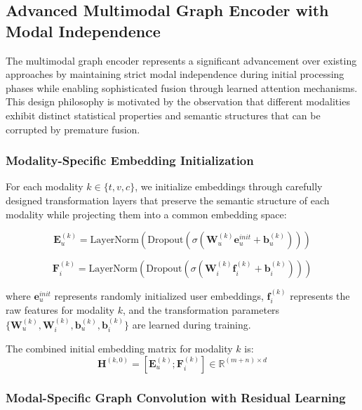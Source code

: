 \documentclass[pdflatex,sn-mathphys-num]{sn-jnl}%
\theoremstyle{thmstyleone}%
\theoremstyle{thmstyletwo}%
\theoremstyle{thmstylethree}%
\begin{document}
\subsection{Advanced Multimodal Graph Encoder with Modal Independence}\label{subsec:encoder}

The multimodal graph encoder represents a significant advancement over existing approaches by maintaining strict modal independence during initial processing phases while enabling sophisticated fusion through learned attention mechanisms. This design philosophy is motivated by the observation that different modalities exhibit distinct statistical properties and semantic structures that can be corrupted by premature fusion.

\subsubsection{Modality-Specific Embedding Initialization}

For each modality $k \in \{t, v, c\}$, we initialize embeddings through carefully designed transformation layers that preserve the semantic structure of each modality while projecting them into a common embedding space:

\begin{equation}
\mathbf{E}_u^{(k)} = \text{LayerNorm}(\text{Dropout}(\sigma(\mathbf{W}_u^{(k)} \mathbf{e}_u^{init} + \mathbf{b}_u^{(k)})))
\end{equation}

\begin{equation}
\mathbf{F}_i^{(k)} = \text{LayerNorm}(\text{Dropout}(\sigma(\mathbf{W}_i^{(k)} \mathbf{f}_i^{(k)} + \mathbf{b}_i^{(k)})))
\end{equation}

where $\mathbf{e}_u^{init}$ represents randomly initialized user embeddings, $\mathbf{f}_i^{(k)}$ represents the raw features for modality $k$, and the transformation parameters $\{\mathbf{W}_u^{(k)}, \mathbf{W}_i^{(k)}, \mathbf{b}_u^{(k)}, \mathbf{b}_i^{(k)}\}$ are learned during training.

The combined initial embedding matrix for modality $k$ is:
\begin{equation}
\mathbf{H}^{(k,0)} = [\mathbf{E}_u^{(k)}; \mathbf{F}_i^{(k)}] \in \mathbb{R}^{(m+n) \times d}
\end{equation}

\subsubsection{Modal-Specific Graph Convolution with Residual Learning}
\end{document}
